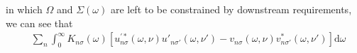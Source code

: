 in which $\Omega$ and $\Sigma(\omega)$ are left to be constrained by downstream requirements, we can see that
\begin{equation}
\begin{split}
&\sum_n\int_0^\infty K_{n\sigma}(\omega)\left[u_{n\sigma}^{\prime*}(\omega,\nu)u'_{n\sigma'}(\omega,\nu') - v_{n\sigma}(\omega,\nu)v_{n\sigma'}^*(\omega,\nu')\right]\mathrm{d}\omega\\

\end{split}
\end{equation}
